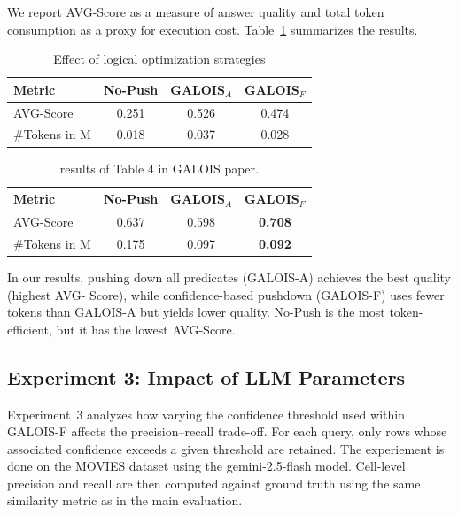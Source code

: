\documentclass[11pt]{article}
\begin{document}
We report AVG-Score as a measure of answer quality and total token consumption as a proxy for execution cost.
Table~\ref{tab:logical_optimization_reformatted} summarizes the results.

\begin{table}[htbp]
\centering
\caption{Effect of logical optimization strategies}
\label{tab:logical_optimization_reformatted}
\begin{tabular}{lccc}
\hline
\textbf{Metric} & \textbf{No-Push} & \textbf{GALOIS$_A$} & \textbf{GALOIS$_F$} \\
\hline
AVG-Score     & 0.251 & 0.526 & 0.474 \\
\#Tokens in M & 0.018 & 0.037 & 0.028 \\
\hline
\end{tabular}
\end{table}


\begin{table}[htbp]
\centering
\caption{results of Table 4 in GALOIS paper.}
\label{tab:logical_optimization}
\begin{tabular}{lccc}
\hline
\textbf{Metric} & \textbf{No-Push} & \textbf{GALOIS$_A$} & \textbf{GALOIS$_F$} \\
\hline
AVG-Score      & 0.637 & 0.598 & \textbf{0.708} \\
\#Tokens in M  & 0.175 & 0.097 & \textbf{0.092} \\
\hline
\end{tabular}
\end{table}

In our results, pushing down all predicates (GALOIS-A) achieves the best quality (highest AVG-
Score), while confidence-based pushdown (GALOIS-F) uses fewer tokens than GALOIS-A but yields
lower quality. No-Push is the most token-efficient, but it has the lowest AVG-Score.



\subsection{Experiment 3: Impact of LLM Parameters}

Experiment~3 analyzes how varying the confidence threshold used within GALOIS-F affects the precision--recall trade-off.
For each query, only rows whose associated confidence exceeds a given threshold are retained. The experiement is done on the MOVIES dataset using the gemini-2.5-flash model.
Cell-level precision and recall are then computed against ground truth using the same similarity metric as in the main evaluation.
\end{document}
